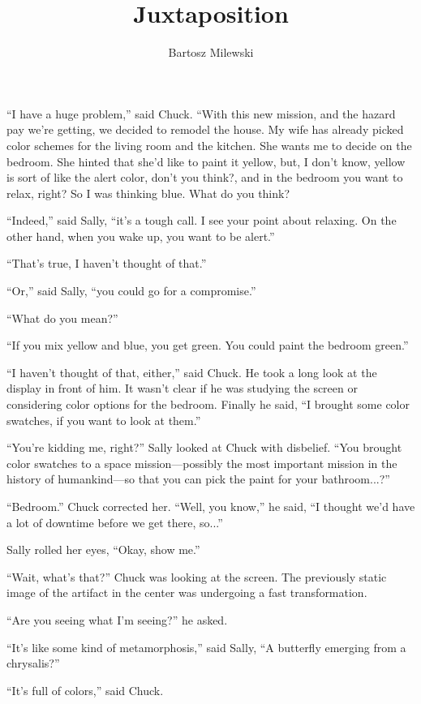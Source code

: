 \documentclass[12pt]{book}
\author{Bartosz Milewski}
\title{Juxtaposition}
\date{}
\begin{document}
\maketitle{}


``I have a huge problem,'' said Chuck. ``With this new mission, and the hazard pay we're getting, we decided to remodel the house. My wife has already picked color schemes for the living room and the kitchen. She wants me to decide on the bedroom. She hinted that she'd like to paint it yellow, but, I don't know, yellow is sort of like the alert color, don't you think?, and in the bedroom you want to relax, right? So I was thinking blue. What do you think?

``Indeed,'' said Sally, ``it's a tough call. I see your point about relaxing. On the other hand, when you wake up, you want to be alert.''

``That's true, I haven't thought of that.''

``Or,'' said Sally, ``you could go for a compromise.''

``What do you mean?''

``If you mix yellow and blue, you get green. You could paint the bedroom green.''

``I haven't thought of that, either,'' said Chuck. He took a long look at the display in front of him. It wasn't clear if he was studying the screen or considering color options for the bedroom. Finally he said, ``I brought some color swatches, if you want to look at them.''

``You're kidding me, right?'' Sally looked at Chuck with disbelief. ``You brought color swatches to a space mission---possibly the most important mission in the history of humankind---so that you can pick the paint for your bathroom...?''

``Bedroom.'' Chuck corrected her. ``Well, you know,'' he said, ``I thought we'd have a lot of downtime before we get there, so...''

Sally rolled her eyes, ``Okay, show me.''

``Wait, what's that?'' Chuck was looking at the screen. The previously static image of the artifact in the center was undergoing a fast transformation. 

``Are you seeing what I'm seeing?'' he asked.

``It's like some kind of metamorphosis,'' said Sally, ``A butterfly emerging from a chrysalis?''

``It's full of colors,'' said Chuck. 
\end{document}
